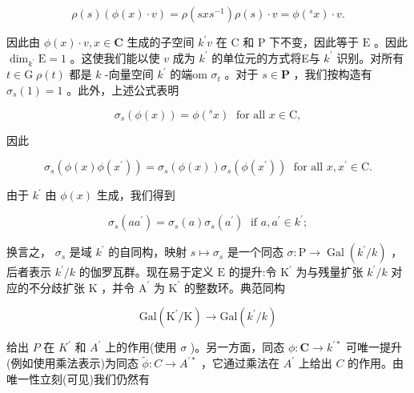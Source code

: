 \documentclass[10pt]{article}
\begin{document}
\[
\rho \left( s\right) \left( {\phi \left( x\right)  \cdot  v}\right)  = \rho \left( {{sx}{s}^{-1}}\right) \rho \left( s\right)  \cdot  v = \phi \left( {{}^{s}x}\right)  \cdot  v.
\]

因此由 \(\phi \left( x\right)  \cdot  v,x \in  \mathbf{C}\) 生成的子空间 \({k}^{\prime }v\) 在 \(\mathrm{C}\) 和 \(\mathrm{P}\) 下不变，因此等于 \(\mathrm{E}\) 。因此 \({\dim }_{{k}^{\prime }}\mathrm{E} = 1\) 。这使我们能以使 \(v\) 成为 \({k}^{\prime }\) 的单位元的方式将E与 \({k}^{\prime }\) 识别。对所有 \(t \in  \mathrm{G} \; \rho \left( t\right)\) 都是 \(k\) -向量空间 \({k}^{\prime }\) 的端om \({\sigma }_{t}\) 。对于 \(s \in  \mathbf{P}\) ，我们按构造有 \({\sigma }_{s}\left( 1\right)  = 1\) 。此外，上述公式表明

\[
{\sigma }_{s}\left( {\phi \left( x\right) }\right)  = \phi \left( {{}^{s}x}\right) \;\text{ for all }x \in  \mathrm{C},
\]

因此

\[
{\sigma }_{s}\left( {\phi \left( x\right) \phi \left( {x}^{\prime }\right) }\right)  = {\sigma }_{s}\left( {\phi \left( x\right) }\right) {\sigma }_{s}\left( {\phi \left( {x}^{\prime }\right) }\right) \;\text{ for all }x,{x}^{\prime } \in  \mathrm{C}.
\]

由于 \({k}^{\prime }\) 由 \(\phi \left( x\right)\) 生成，我们得到

\[
{\sigma }_{s}\left( {a{a}^{\prime }}\right)  = {\sigma }_{s}\left( a\right) {\sigma }_{s}\left( {a}^{\prime }\right) \;\text{ if }a,{a}^{\prime } \in  {k}^{\prime };
\]

换言之， \({\sigma }_{s}\) 是域 \({k}^{\prime }\) 的自同构，映射 \(s \mapsto  {\sigma }_{s}\) 是一个同态 \(\sigma  : \mathrm{P} \rightarrow  \operatorname{Gal}\left( {{k}^{\prime }/k}\right)\) ，后者表示 \({k}^{\prime }/k\) 的伽罗瓦群。现在易于定义 \(\mathrm{E}\) 的提升:令 \({\mathrm{K}}^{\prime }\) 为与残量扩张 \({k}^{\prime }/k\) 对应的不分歧扩张 \(\mathrm{K}\) ，并令 \({\mathrm{A}}^{\prime }\) 为 \({\mathrm{K}}^{\prime }\) 的整数环。典范同构

\[
\mathrm{{Gal}}\left( {{\mathrm{K}}^{\prime }/\mathrm{K}}\right)  \rightarrow  \mathrm{{Gal}}\left( {{k}^{\prime }/k}\right)
\]

给出 \(P\) 在 \({K}^{\prime }\) 和 \({A}^{\prime }\) 上的作用(使用 \(\sigma\) )。另一方面，同态 \(\phi  : \mathbf{C} \rightarrow  {k}^{\prime  * }\) 可唯一提升(例如使用乘法表示)为同态 \(\widetilde{\phi } : C \rightarrow  {A}^{\prime  * }\) ，它通过乘法在 \({A}^{\prime }\) 上给出 \(C\) 的作用。由唯一性立刻(可见)我们仍然有
\end{document}
